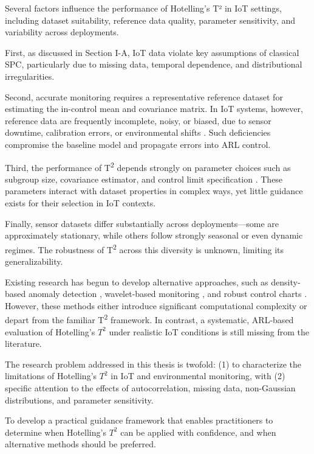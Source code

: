 Several factors influence the performance of Hotelling’s T² in IoT settings, including dataset suitability, reference data quality, parameter sensitivity, and variability across deployments.

First, as discussed in Section I-A, \ac{IoT} data violate key assumptions of classical \ac{SPC}, particularly due to missing data, temporal dependence, and distributional irregularities.

Second, accurate monitoring requires a representative reference dataset for estimating the in-control mean and covariance matrix. In \ac{IoT} systems, however, reference data are frequently incomplete, noisy, or biased, due to sensor downtime, calibration errors, or environmental shifts \cite{Yoon2019}. Such deficiencies compromise the baseline model and propagate errors into \ac{ARL} control.

Third, the performance of T\textsuperscript{2} depends strongly on parameter choices such as subgroup size, covariance estimator, and control limit specification \cite{Gray2017} \cite{Jolliffe2002}. These parameters interact with dataset properties in complex ways, yet little guidance exists for their selection in \ac{IoT} contexts.

Finally, sensor datasets differ substantially across deployments—some are approximately stationary, while others follow strongly seasonal or even dynamic regimes. The robustness of T\textsuperscript{2} across this diversity is unknown, limiting its generalizability.

Existing research has begun to develop alternative approaches, such as density-based anomaly detection \cite{Breunig2000}, wavelet-based monitoring \cite{Cohen2020}, and robust control charts \cite{Xie2024}. However, these methods either introduce significant computational complexity or depart from the familiar T\textsuperscript{2} framework. In contrast, a systematic, \ac{ARL}-based evaluation of Hotelling’s $T^2$ under realistic \ac{IoT} conditions is still missing from the literature.

The research problem addressed in this thesis is twofold: (1) to characterize the limitations of Hotelling’s $T^2$ in \ac{IoT} and environmental monitoring, with (2) specific attention to the effects of autocorrelation, missing data, non-Gaussian distributions, and parameter sensitivity.


To develop a practical guidance framework that enables practitioners to determine when Hotelling’s $T^2$ can be applied with confidence, and when alternative methods should be preferred.

